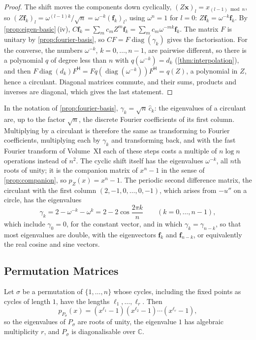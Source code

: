 \begin{proof}
The shift moves the components down cyclically, $(Z\mathbf x)_l=x_{(l-1)\bmod n}$, so $(Z\mathbf f_k)_l=\omega^{(l-1)k}/\sqrt n=\omega^{-k}(\mathbf f_k)_l$, using $\omega^n=1$ for $l=0$: $Z\mathbf f_k=\omega^{-k}\mathbf f_k$. By \cref{prop:eigen-basic}\,(iv), $C\mathbf f_k=\sum_mc_mZ^m\mathbf f_k=\sum_mc_m\omega^{-mk}\mathbf f_k$. The matrix $F$ is unitary by \cref{prop:fourier-basis}, so $CF=F\operatorname{diag}(\gamma_k)$ gives the factorisation. For the converse, the numbers $\omega^{-k}$, $k=0,\ldots,n-1$, are pairwise different, so there is a polynomial $q$ of degree less than $n$ with $q(\omega^{-k})=d_k$ (\cref{thm:interpolation}), and then $F\operatorname{diag}(d_k)F^{\mathsf H}=Fq(\operatorname{diag}(\omega^{-k}))F^{\mathsf H}=q(Z)$, a polynomial in $Z$, hence a circulant. Diagonal matrices commute, and their sums, products and inverses are diagonal, which gives the last statement.
\end{proof}

In the notation of \cref{prop:fourier-basis}, $\gamma_k=\sqrt n\,\hat c_k$: the eigenvalues of a circulant are, up to the factor $\sqrt n$, the discrete Fourier coefficients of its first column. Multiplying by a circulant is therefore the same as transforming to Fourier coefficients, multiplying each by $\gamma_k$ and transforming back, and with the fast Fourier transform of Volume~XI each of these steps costs a multiple of $n\log n$ operations instead of $n^2$. The cyclic shift itself has the eigenvalues $\omega^{-k}$, all $n$th roots of unity; it is the companion matrix of $x^n-1$ in the sense of \cref{prop:companion}, so $p_Z(x)=x^n-1$. The periodic second difference matrix, the circulant with the first column $(2,-1,0,\ldots,0,-1)$, which arises from $-u''$ on a circle, has the eigenvalues
\[
\gamma_k=2-\omega^{-k}-\omega^{k}=2-2\cos\frac{2\pi k}n\qquad(k=0,\ldots,n-1),
\]
which include $\gamma_0=0$, for the constant vector, and in which $\gamma_k=\gamma_{n-k}$, so that most eigenvalues are double, with the eigenvectors $\mathbf f_k$ and $\mathbf f_{n-k}$, or equivalently the real cosine and sine vectors.

\subsection{Permutation Matrices}

\begin{proposition}
\label{prop:permutation-eigen}
Let $\sigma$ be a permutation of $\{1,\ldots,n\}$ whose cycles, including the fixed points as cycles of length $1$, have the lengths $\ell_1,\ldots,\ell_r$. Then
\[
p_{P_\sigma}(x)=(x^{\ell_1}-1)(x^{\ell_2}-1)\cdots(x^{\ell_r}-1),
\]
so the eigenvalues of $P_\sigma$ are roots of unity, the eigenvalue $1$ has algebraic multiplicity $r$, and $P_\sigma$ is diagonalisable over $\mathbb C$.
\end{proposition}

